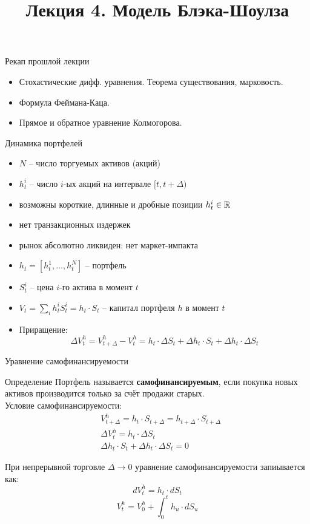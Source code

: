 \documentclass[aspectratio=169]{beamer}
\title[Модель Блэка-Шоулза]{Лекция 4. Модель Блэка-Шоулза} %
\begin{document}
\begin{frame}
\titlepage 
\end{frame}

\begin{frame}{Рекап прошлой лекции} 
\begin{itemize} 
    \item Стохастические дифф. уравнения. Теорема существования, марковость.
    \item Формула Феймана-Каца.
    \item Прямое и обратное уравнение Колмогорова.
\end{itemize}
\end{frame}

\begin{frame}{Динамика портфелей}
    \begin{itemize}
        \item $N$ -- число торгуемых активов (акций)
        \item $h^i_t$ -- число $i$-ых акций на интервале $[t, t + \Delta)$
        \item возможны короткие, длинные и дробные позиции $h^i_t \in \mathbb{R}$
        \item нет транзакционных издержек 
        \item рынок абсолютно ликвиден: нет маркет-импакта
        \item $h_t = [h^1_t, \ldots, h^N_t]$ -- портфель
        \item $S^i_t$ -- цена $i$-го актива в момент $t$
        \item $V_t = \sum_i h^i_t S^i_t = h_t \cdot S_t$ -- капитал портфеля $h$ в момент $t$
        \item Приращение:
        $$
            \Delta V^h_t = V^h_{t + \Delta} - V^h_t = h_t \cdot \Delta S_t + \Delta h_t \cdot S_t + \Delta h_t \cdot \Delta S_t
        $$
    \end{itemize}
\end{frame}

\begin{frame}{Уравнение самофинансируемости}
    \begin{block}{Определение}
        Портфель называется \textbf{самофинансируемым}, если покупка новых активов производится только за счёт продажи старых. 
        \\ Условие самофинансируемости:
        \begin{align*}
            & V^h_{t+\Delta} = h_t \cdot S_{t+\Delta} = h_{t+\Delta} \cdot S_{t+\Delta} \\
            & \Delta V^h_t = h_t \cdot \Delta S_t \\
            & \Delta h_t \cdot S_t + \Delta h_t \cdot \Delta S_t = 0
        \end{align*}
    \end{block}
    При непрерывной торговле $\Delta \to 0$ уравнение самофинансируемости запиывается как:
    $$
        d V^h_t = h_t \cdot dS_t 
    $$
    $$
        V^h_t = V^h_0 + \int_0^t h_u \cdot dS_u
    $$
\end{frame}
\end{document}
